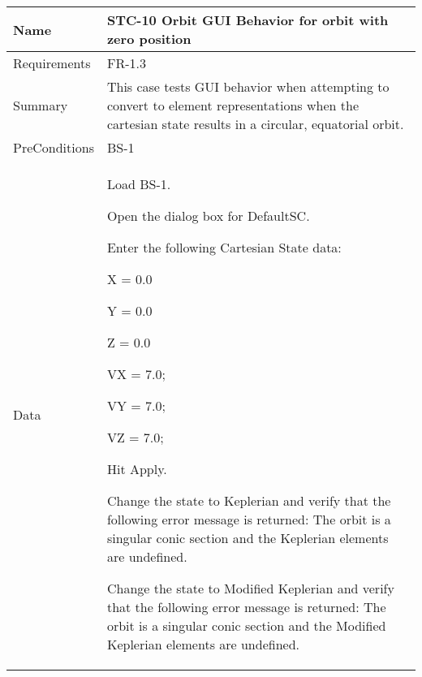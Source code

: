 







\begin{table}[htbp!]
\centering
      \begin{tabular}{|p{1.05 in} |p{4.75 in} |}
      \hline
         \rowcolor[rgb]{0.8,0.8,0.8} Name & STC-10 Orbit GUI Behavior for orbit with zero position\\
         \hline
         Requirements & FR-1.3\\  \hline
         Summary &
         This  case tests GUI behavior when attempting to convert to element representations when the
         cartesian state results in a circular, equatorial orbit.
         \\     \hline
         PreConditions & BS-1\\     \hline
         Data &
         \begin{compactenum}
             \item Load BS-1.
             \item Open the dialog box for DefaultSC.
             \item Enter the following Cartesian State data:
                      \begin{compactenum}
                         \item X = 0.0
                         \item Y = 0.0
                         \item Z = 0.0
                         \item VX = 7.0;
                         \item VY = 7.0;
                         \item VZ = 7.0;
                      \end{compactenum}
             \item Hit Apply.
             \item Change the state to Keplerian and verify that the following error message is returned: The orbit is a singular conic section and the Keplerian elements are undefined.
             \item Change the state to Modified Keplerian and verify that the following error message is returned: The orbit is a singular conic section and the Modified Keplerian elements are undefined.

\end{compactenum}
\end{tabular}
\end{table}
